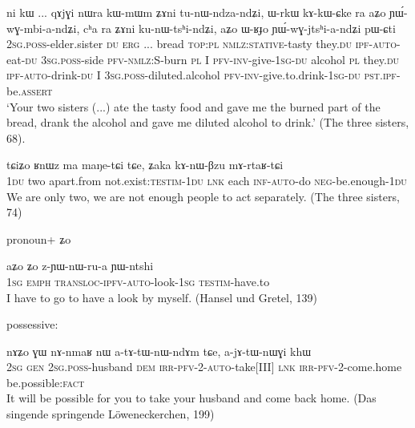 \documentclass[oldfontcommands,oneside,a4paper,11pt]{article}
\newcommand{\ipa}[1]{{\phon \mbox{#1}}} %
\begin{document}
   \begin{exe}
\ex \label{ex:tunWndzandZi}
\gll  \ipa{nɤ-pi}   	\ipa{ni}   	\ipa{kɯ}   	...   	\ipa{qɤjɣi}   	\ipa{nɯra}   	\ipa{kɯ-mɯm}   	\ipa{ʑɤni}   	\ipa{tu-nɯ-ndza-ndʑi,}   	\ipa{ɯ-rkɯ}   	\ipa{kɤ-kɯ-ɕke}   	\ipa{ra}   	\ipa{aʑo}   	\ipa{ɲɯ́-wɣ-mbi-a-ndʑi,}   	\ipa{cʰa}   	\ipa{ra}   	\ipa{ʑɤni}   	\ipa{ku-nɯ-tsʰi-ndʑi,}   	\ipa{aʑo}   	\ipa{ɯ-ʁɟo}   	\ipa{ɲɯ́-wɣ-jtsʰi-a-ndʑi}   	\ipa{pɯ-ɕti}        \\
\textsc{2sg.poss}-elder.sister \textsc{du} \textsc{erg} ... bread \textsc{top:pl} \textsc{nmlz:stative}-tasty they.\textsc{du} \textsc{ipf}-\textsc{auto}-eat-\textsc{du} \textsc{3sg.poss}-side \textsc{pfv}-\textsc{nmlz:S}-burn \textsc{pl}  I \textsc{pfv}-\textsc{inv}-give-\textsc{1sg}-\textsc{du} alcohol \textsc{pl} they.\textsc{du} \textsc{ipf}-\textsc{auto}-drink-\textsc{du} I \textsc{3sg.poss}-diluted.alcohol \textsc{pfv}-\textsc{inv}-give.to.drink-\textsc{1sg}-\textsc{du} \textsc{pst.ipf}-be.\textsc{assert}  \\
 \glt    `Your two sisters (...) ate the tasty food and gave me the burned part of the bread, drank the alcohol and gave me diluted alcohol to drink.'  (The three sisters, 68).
\end{exe} 

   \begin{exe}
\ex \label{ex:kAnWBzu.mArtaRtCi}
\gll
\ipa{tɕiʑo} 	\ipa{ʁnɯz} 	\ipa{ma} 	\ipa{maŋe-tɕi} 	\ipa{tɕe,} 	\ipa{ʑaka} 	\ipa{kɤ-nɯ-βzu} 	\ipa{mɤ-rtaʁ-tɕi} \\
\textsc{1du} two apart.from not.exist:\textsc{testim}-\textsc{1du} \textsc{lnk} each \textsc{inf-auto}-do \textsc{neg}-be.enough-\textsc{1du} \\
\glt We are only two, we are not enough people to act separately. (The three sisters, 74)
\end{exe} 

pronoun+ \ipa{ʑo}

\begin{exe}
\ex \label{ex:zYWnWrua}
\gll
\ipa{aʑo} 	\ipa{ʑo} 	\ipa{z-ɲɯ-nɯ-ru-a} 	\ipa{ɲɯ-ntshi} \\
\textsc{1sg} \textsc{emph} \textsc{transloc-ipfv-auto}-look-\textsc{1sg} \textsc{testim}-have.to \\
\glt I have to go to have a look by myself. (Hansel und Gretel, 139)
\end{exe} 

possessive:
\begin{exe}
\ex \label{ex:atAtWnWndAm}
\gll
\ipa{nɤʑo} 	\ipa{ɣɯ} 	\ipa{nɤ-nmaʁ} 	\ipa{nɯ} 	\ipa{a-tɤ-tɯ-nɯ-ndɤm} 	\ipa{tɕe,} 	\ipa{a-jɤ-tɯ-nɯɣi} 	\ipa{khɯ}   \\
\textsc{2sg} \textsc{gen} \textsc{2sg.poss}-husband \textsc{dem} \textsc{irr-pfv-2-auto}-take[III]  \textsc{lnk} \textsc{irr-pfv-2}-come.home  be.possible:\textsc{fact} \\
\glt It will be possible for you to take your husband and come back home. (Das singende springende Löweneckerchen, 199)
\end{exe} 
\end{document}
